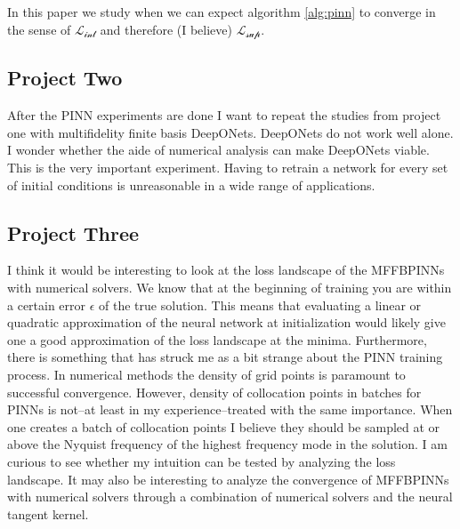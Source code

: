 \documentclass[12pt]{article}
\def\t{\text}
\begin{document}
In this paper we study when we can expect algorithm \ref{alg:pinn} to converge in the sense of
$\mathcal{L_{\t{int}}}$ and therefore (I believe) $\mathcal{L_{\text{sup}}}$.



\newpage

\subsection*{Project Two}
After the PINN experiments are done I want to repeat the studies from project one with multifidelity finite basis DeepONets. 
DeepONets do not work well alone. I wonder whether the aide of numerical analysis can make DeepONets viable. This is the 
very important experiment. Having to retrain a network for every set of initial conditions is unreasonable in a wide range of applications.
\subsection*{Project Three}
I think it would be interesting to look at the loss landscape of the MFFBPINNs with numerical solvers. We know that at 
the beginning of training you are within a certain error $\epsilon$ of the true solution. This means that evaluating a linear
or quadratic approximation of the neural network at initialization would likely give one a good approximation of the loss landscape at the minima. Furthermore, there is something that has struck me as a bit strange about the PINN training process.
In numerical methods the density of grid points is paramount to successful convergence. However, density of collocation points in batches for PINNs is not--at least in my experience--treated with the same importance. When one creates a batch of collocation points 
I believe they should be sampled at or above the Nyquist frequency of the highest frequency mode in the solution. I am curious to see 
whether my intuition can be tested by analyzing the loss landscape. It may also be interesting to analyze the convergence of MFFBPINNs with
numerical solvers through a combination of numerical solvers and the neural tangent kernel.


\end{document}

